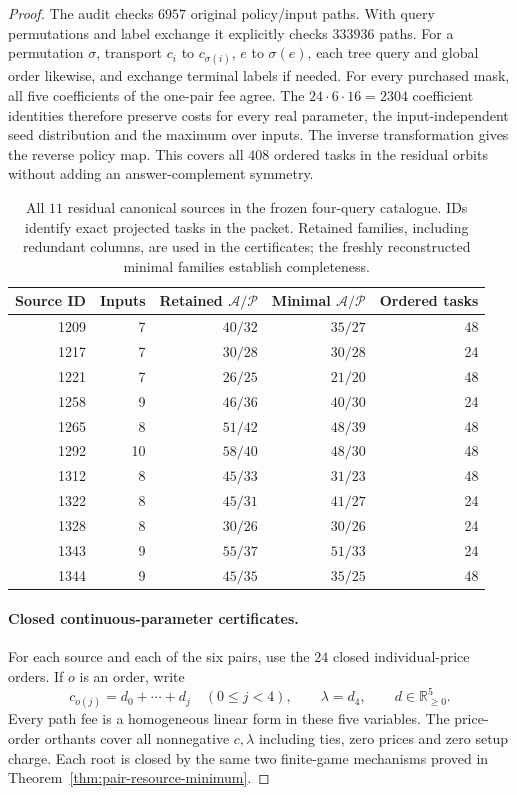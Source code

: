 \begin{proof}
The audit checks $6957$ original policy/input paths. With query
permutations and label exchange it explicitly checks $333936$ paths.
For a permutation $\sigma$, transport $c_i$ to $c_{\sigma(i)}$,
$e$ to $\sigma(e)$, each tree query and global order likewise, and
exchange terminal labels if needed. For every purchased mask, all
five coefficients of the one-pair fee agree. The $24\cdot6\cdot16
=2304$ coefficient identities therefore preserve costs for every
real parameter, the input-independent seed distribution and the
maximum over inputs. The inverse transformation gives the reverse
policy map. This covers all $408$ ordered tasks in the residual
orbits without adding an answer-complement symmetry.

\begin{table}[ht]
\centering\small
\begin{tabular}{@{}rrrrr@{}}
\toprule
Source ID & Inputs & Retained $\mathcal A/\mathcal P$
          & Minimal $\mathcal A/\mathcal P$ & Ordered tasks\\
\midrule
1209 & 7 & $40/32$ & $35/27$ & 48\\
1217 & 7 & $30/28$ & $30/28$ & 24\\
1221 & 7 & $26/25$ & $21/20$ & 48\\
1258 & 9 & $46/36$ & $40/30$ & 24\\
1265 & 8 & $51/42$ & $48/39$ & 48\\
1292 & 10 & $58/40$ & $48/30$ & 48\\
1312 & 8 & $45/33$ & $31/23$ & 48\\
1322 & 8 & $45/31$ & $41/27$ & 24\\
1328 & 8 & $30/26$ & $30/26$ & 24\\
1343 & 9 & $55/37$ & $51/33$ & 24\\
1344 & 9 & $45/35$ & $35/25$ & 48\\
\bottomrule
\end{tabular}
\caption{All $11$ residual canonical sources in the frozen four-query
catalogue. IDs identify exact projected tasks in the packet. Retained
families, including redundant columns, are used in the certificates;
the freshly reconstructed minimal families establish completeness.}
\label{tab:global-pair-residuals}
\end{table}

\paragraph*{Closed continuous-parameter certificates.}
For each source and each of the six pairs, use the $24$ closed
individual-price orders. If $o$ is an order, write
\[
 c_{o(j)}=d_0+\cdots+d_j\quad(0\leq j<4),\qquad
 \lambda=d_4,\qquad d\in\mathbb R_{\geq0}^{5}.
\]
Every path fee is a homogeneous linear form in these five variables.
The price-order orthants cover all nonnegative $c,\lambda$ including
ties, zero prices and zero setup charge. Each root is closed by the
same two finite-game mechanisms proved in
Theorem~\ref{thm:pair-resource-minimum}.


\end{proof}
